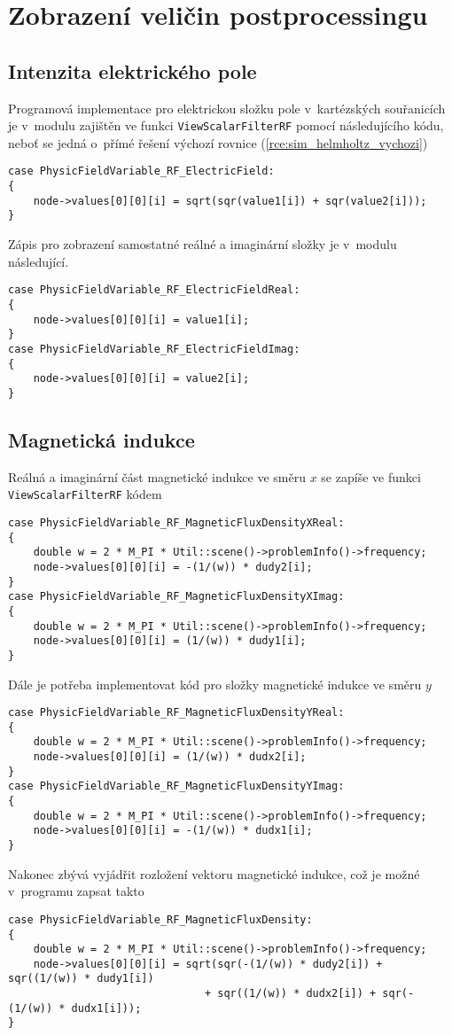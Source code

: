 \section{Zobrazení veličin postprocessingu}
\subsection*{Intenzita elektrického pole}
Programová implementace pro elektrickou složku pole v~kartézských souřanicích je v~modulu zajištěn ve funkci \texttt{ViewScalarFilterRF} pomocí následujícího kódu, neboť se jedná o~přímé řešení výchozí rovnice (\ref{rce:sim_helmholtz_vychozi})
\begin{verbatim}
case PhysicFieldVariable_RF_ElectricField:
{
    node->values[0][0][i] = sqrt(sqr(value1[i]) + sqr(value2[i]));
}    
\end{verbatim}
Zápis pro zobrazení samostatné reálné a imaginární složky je v~modulu následující.
\begin{verbatim}
case PhysicFieldVariable_RF_ElectricFieldReal:
{
    node->values[0][0][i] = value1[i];
}    
case PhysicFieldVariable_RF_ElectricFieldImag:
{    
    node->values[0][0][i] = value2[i];
}
\end{verbatim}

\subsection*{Magnetická indukce}
Reálná a imaginární část magnetické indukce ve směru $x$ se zapíše ve funkci \texttt{ViewScalarFilterRF} kódem
\begin{verbatim}
case PhysicFieldVariable_RF_MagneticFluxDensityXReal:
{
    double w = 2 * M_PI * Util::scene()->problemInfo()->frequency;
    node->values[0][0][i] = -(1/(w)) * dudy2[i];
}
case PhysicFieldVariable_RF_MagneticFluxDensityXImag:
{
    double w = 2 * M_PI * Util::scene()->problemInfo()->frequency;
    node->values[0][0][i] = (1/(w)) * dudy1[i];
}    
\end{verbatim}
Dále je potřeba implementovat kód pro složky magnetické indukce ve směru $y$
\begin{verbatim}
case PhysicFieldVariable_RF_MagneticFluxDensityYReal:
{
    double w = 2 * M_PI * Util::scene()->problemInfo()->frequency;
    node->values[0][0][i] = (1/(w)) * dudx2[i];
}
case PhysicFieldVariable_RF_MagneticFluxDensityYImag:
{
    double w = 2 * M_PI * Util::scene()->problemInfo()->frequency;
    node->values[0][0][i] = -(1/(w)) * dudx1[i];
}
\end{verbatim}
Nakonec zbývá vyjádřit rozložení vektoru magnetické indukce, což je možné v~programu zapsat takto
\begin{verbatim}
case PhysicFieldVariable_RF_MagneticFluxDensity:
{
    double w = 2 * M_PI * Util::scene()->problemInfo()->frequency;
    node->values[0][0][i] = sqrt(sqr(-(1/(w)) * dudy2[i]) + sqr((1/(w)) * dudy1[i])
                               + sqr((1/(w)) * dudx2[i]) + sqr(-(1/(w)) * dudx1[i]));
}
\end{verbatim}


